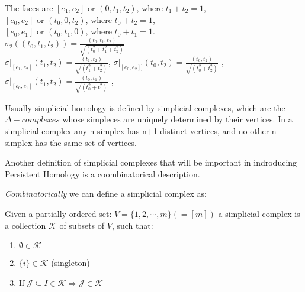 \documentclass[11pt,a4paper]{report}
\begin{document}
\begin{Ex}
            The faces are $[e_1, e_2]$ or $(0, t_1, t_2)$, where $t_1 + t_2 = 1$, \\
            $[e_0, e_2]$ or $(t_0, 0, t_2)$, where $t_0 + t_2 = 1$, \\
            $[e_0, e_1]$ or $(t_0, t_1, 0)$, where $t_0 + t_1 = 1$. \\
              

              $\sigma_2((t_0, t_1, t_2)) = \frac{(t_0, t_1, t_2)}{\sqrt{(t_0^2 + t_1^2 + t_2^2)}}$ \\ 
              $\sigma|_{[e_1, e_2]}(t_1, t_2) =\frac{(t_1, t_2)}{\sqrt{(t_1^2 + t_2^2)}}$, \quad
              $\sigma|_{[e_0, e_2]]}(t_0, t_2) =\frac{(t_0, t_2)}{\sqrt{(t_0^2 + t_2^2)}}$ , \quad
              $\sigma|_{[e_0, e_1]}(t_1, t_2) =\frac{(t_0, t_1)}{\sqrt{(t_0^2 + t_1^2)}}$ ,
     \end{Ex}

		     Usually simplicial homology is defined by simplicial complexes, which are the $\Delta-complexes$ whose simpleces are uniquely determined by their vertices. In a simplicial complex any n-simplex has n+1 distinct vertices, and no other n-simplex has the same set of vertices. 
		     
		     Another definition of simplicial complexes that will be important in indroducing Persistent Homology is a coombinatorical description. 
		     
		     \emph{Combinatorically} we can define a simplicial complex as: 
		     
		     \begin{defn}  
              Given a partially ordered set: $V = \{1, 2, \cdots, m\} (=[m])$ 
              a simplicial complex is a collection $\mathcal{K}$ of subsets of $V$, such that:\\
              \begin{enumerate}
              \item $\emptyset \in \mathcal{K}$
              \item $\{i\} \in \mathcal{K}$ (singleton)
              \item If $\mathcal{J} \subseteq I \in \mathcal{K} \Rightarrow \mathcal{J} \in \mathcal{K}$
              \end{enumerate}
		      
		     \end{defn}
\end{document}
